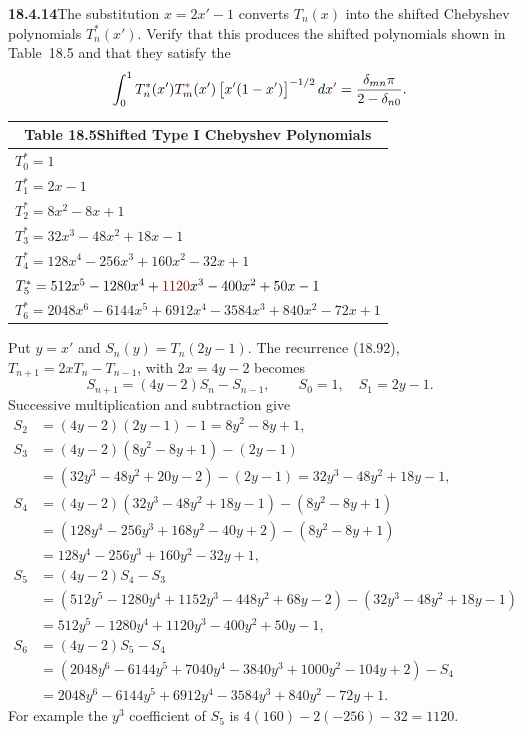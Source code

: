 \par\bigskip
\noindent\textbf{18.4.14}\quad The substitution $x=2x'-1$ converts
$T_{n}(x)$ into the shifted Chebyshev polynomials $T_{n}^{*}(x')$.
Verify that this produces the shifted polynomials shown in
Table~18.5 and that they satisfy the 
\[
\int_{0}^{1}T_{n}^{*}(x')T_{m}^{\erratum{*}}(x')\,
\big[x\erratum{'}(1-x\erratum{'})\big]^{-1/2}\,dx\erratum{'}
=\frac{\delta_{mn}\pi}{2-\delta_{n0}}.
\]
\begin{center}
\begin{tabular}{l}
\multicolumn{1}{c}{Table 18.5\quad Shifted Type I Chebyshev
Polynomials}\\[4pt]
\toprule
$T_{0}^{*}=1$\\
$T_{1}^{*}=2x-1$\\
$T_{2}^{*}=8x^{2}-8x+1$\\
$T_{3}^{*}=32x^{3}-48x^{2}+18x-1$\\
$T_{4}^{*}=128x^{4}-256x^{3}+160x^{2}-32x+1$\\
$T_{5}^{*}=512x^{5}-1280x^{4}+\erratum{1120}x^{3}-400x^{2}+50x-1$\\
$T_{6}^{*}=2048x^{6}-6144x^{5}+6912x^{4}-3584x^{3}+840x^{2}-72x+1$\\
\bottomrule
\end{tabular}
\end{center}
\solution
Put $y=x'$ and $S_n(y)=T_n(2y-1)$.  The recurrence (18.92),
$T_{n+1}=2xT_n-T_{n-1}$, with $2x=4y-2$ becomes
\[
S_{n+1}=(4y-2)S_n-S_{n-1},\qquad S_0=1,\quad S_1=2y-1.
\]
Successive multiplication and subtraction give
\begin{align*}
S_2&=(4y-2)(2y-1)-1=8y^2-8y+1,\\
S_3&=(4y-2)(8y^2-8y+1)-(2y-1)\\
   &=(32y^3-48y^2+20y-2)-(2y-1)
    =32y^3-48y^2+18y-1,\\
S_4&=(4y-2)(32y^3-48y^2+18y-1)-(8y^2-8y+1)\\
   &=(128y^4-256y^3+168y^2-40y+2)-(8y^2-8y+1)\\
   &=128y^4-256y^3+160y^2-32y+1,\\
S_5&=(4y-2)S_4-S_3\\
   &=(512y^5-1280y^4+1152y^3-448y^2+68y-2)
     -(32y^3-48y^2+18y-1)\\
   &=512y^5-1280y^4+1120y^3-400y^2+50y-1,\\
S_6&=(4y-2)S_5-S_4\\
   &=(2048y^6-6144y^5+7040y^4-3840y^3+1000y^2-104y+2)-S_4\\
   &=2048y^6-6144y^5+6912y^4-3584y^3+840y^2-72y+1.
\end{align*}
For example the $y^3$ coefficient of $S_5$ is
$4(160)-2(-256)-32=1120$.

